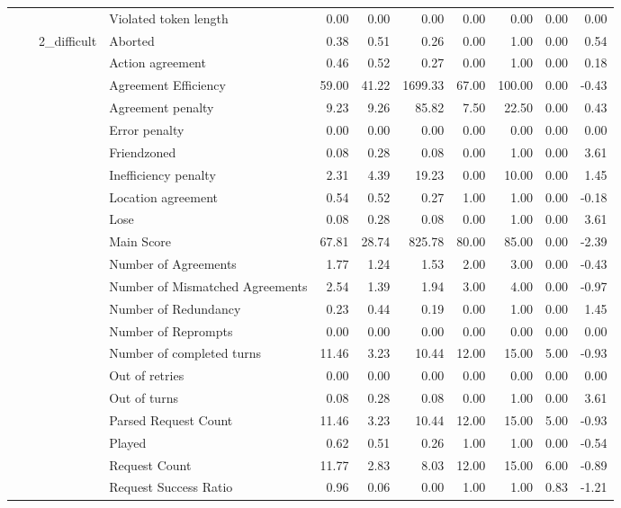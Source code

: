 \begin{tabular}{llllrrrrrrr}
 &  &  & Violated token length & 0.00 & 0.00 & 0.00 & 0.00 & 0.00 & 0.00 & 0.00 \\
\cline{3-11}
 &  & \multirow[t]{27}{*}{2_difficult} & Aborted & 0.38 & 0.51 & 0.26 & 0.00 & 1.00 & 0.00 & 0.54 \\
 &  &  & Action agreement & 0.46 & 0.52 & 0.27 & 0.00 & 1.00 & 0.00 & 0.18 \\
 &  &  & Agreement Efficiency & 59.00 & 41.22 & 1699.33 & 67.00 & 100.00 & 0.00 & -0.43 \\
 &  &  & Agreement penalty & 9.23 & 9.26 & 85.82 & 7.50 & 22.50 & 0.00 & 0.43 \\
 &  &  & Error penalty & 0.00 & 0.00 & 0.00 & 0.00 & 0.00 & 0.00 & 0.00 \\
 &  &  & Friendzoned & 0.08 & 0.28 & 0.08 & 0.00 & 1.00 & 0.00 & 3.61 \\
 &  &  & Inefficiency penalty & 2.31 & 4.39 & 19.23 & 0.00 & 10.00 & 0.00 & 1.45 \\
 &  &  & Location agreement & 0.54 & 0.52 & 0.27 & 1.00 & 1.00 & 0.00 & -0.18 \\
 &  &  & Lose & 0.08 & 0.28 & 0.08 & 0.00 & 1.00 & 0.00 & 3.61 \\
 &  &  & Main Score & 67.81 & 28.74 & 825.78 & 80.00 & 85.00 & 0.00 & -2.39 \\
 &  &  & Number of Agreements & 1.77 & 1.24 & 1.53 & 2.00 & 3.00 & 0.00 & -0.43 \\
 &  &  & Number of Mismatched Agreements & 2.54 & 1.39 & 1.94 & 3.00 & 4.00 & 0.00 & -0.97 \\
 &  &  & Number of Redundancy & 0.23 & 0.44 & 0.19 & 0.00 & 1.00 & 0.00 & 1.45 \\
 &  &  & Number of Reprompts & 0.00 & 0.00 & 0.00 & 0.00 & 0.00 & 0.00 & 0.00 \\
 &  &  & Number of completed turns & 11.46 & 3.23 & 10.44 & 12.00 & 15.00 & 5.00 & -0.93 \\
 &  &  & Out of retries & 0.00 & 0.00 & 0.00 & 0.00 & 0.00 & 0.00 & 0.00 \\
 &  &  & Out of turns & 0.08 & 0.28 & 0.08 & 0.00 & 1.00 & 0.00 & 3.61 \\
 &  &  & Parsed Request Count & 11.46 & 3.23 & 10.44 & 12.00 & 15.00 & 5.00 & -0.93 \\
 &  &  & Played & 0.62 & 0.51 & 0.26 & 1.00 & 1.00 & 0.00 & -0.54 \\
 &  &  & Request Count & 11.77 & 2.83 & 8.03 & 12.00 & 15.00 & 6.00 & -0.89 \\
 &  &  & Request Success Ratio & 0.96 & 0.06 & 0.00 & 1.00 & 1.00 & 0.83 & -1.21 \\

\end{tabular}
